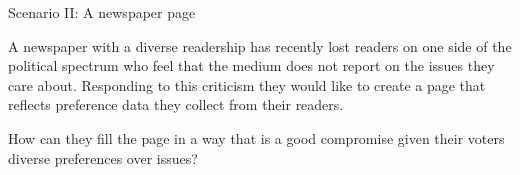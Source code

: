 \documentclass{beamer}
\begin{document}
\begin{frame}{Scenario II: A newspaper page}

A newspaper with a diverse readership has recently lost readers on one side of the political spectrum who feel that the medium does not report on the issues they care about. Responding to this criticism they would like to create a page that reflects preference data they collect from their readers.

How can they fill the page in a way that is a good compromise given their voters diverse preferences over issues?
	
	
	
\end{frame}
\end{document}
